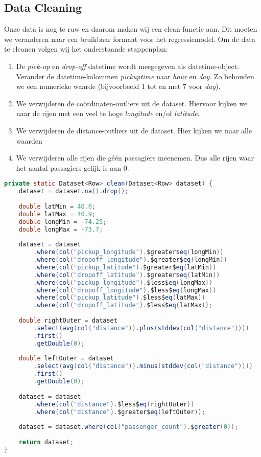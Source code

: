 \documentclass[a4paper,10pt,twoside]{report}
\begin{document}
\newpage

\subsection*{Data Cleaning}

Onze data is nog te ruw en daarom maken wij een clean-functie aan. Dit moeten we veranderen naar een bruikbaar formaat voor het regressiemodel. Om de data te cleanen volgen wij het onderstaande stappenplan:

\begin{enumerate}
	\item De \textit{pick-up} en \textit{drop-off} datetime wordt meegegeven als datetime-object. Verander de datetime-kolommen \textit{pickuptime} naar \textit{hour} en \textit{day}. Zo behouden we een numerieke waarde (bijvoorbeeld 1 tot en met 7 voor \textit{day}).
	\item We verwijderen de coördinaten-outliers uit de dataset. Hiervoor kijken we naar de rijen met een veel te hoge \textit{longitude} en/of \textit{latitude}.

	\item We verwijderen de distance-outliers uit de dataset. Hier kijken we naar alle waarden 
		
	\item We verwijderen alle rijen die géén passagiers meenemen. Dus alle rijen waar het aantal passagiers gelijk is aan 0.
\end{enumerate}

\begin{lstlisting}[language=Java]
private static Dataset<Row> clean(Dataset<Row> dataset) {
	dataset = dataset.na().drop();
	
	double latMin = 40.6;
	double latMax = 40.9;
	double longMin = -74.25;
	double longMax = -73.7;
	
	dataset = dataset
		.where(col("pickup_longitude").$greater$eq(longMin))
		.where(col("dropoff_longitude").$greater$eq(longMin))
		.where(col("pickup_latitude").$greater$eq(latMin))
		.where(col("dropoff_latitude").$greater$eq(latMin))
		.where(col("pickup_longitude").$less$eq(longMax))
		.where(col("dropoff_longitude").$less$eq(longMax))
		.where(col("pickup_latitude").$less$eq(latMax))
		.where(col("dropoff_latitude").$less$eq(latMax));
		
	double rightOuter = dataset
		.select(avg(col("distance")).plus(stddev(col("distance"))))
		.first()
		.getDouble(0);
	
	double leftOuter = dataset
		.select(avg(col("distance")).minus(stddev(col("distance"))))
		.first()
		.getDouble(0); 
	
	dataset = dataset
		.where(col("distance").$less$eq(rightOuter))
		.where(col("distance").$greater$eq(leftOuter));
	
	dataset = dataset.where(col("passenger_count").$greater(0));
	
	return dataset;
}
\end{lstlisting}
\end{document}
